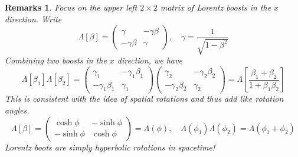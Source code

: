 \documentclass[a4paper]{article}
\newtheorem{remarks}{Remarks}[section]
\theoremstyle{new}
\begin{document}
\begin{remarks}
Focus on the upper left $2\times 2$ matrix of Lorentz boosts in the $x$ direction. Write
$$\Lambda[\beta] =
  \begin{pmatrix}
    \gamma & -\gamma\beta\\
    -\gamma\beta & \gamma
  \end{pmatrix}
  ,\quad
  \gamma = \frac{1}{\sqrt{1 - \beta^2}}$$
Combining two boosts in the $x$ direction, we have
$$\Lambda[\beta_1]\Lambda[\beta_2] =
  \begin{pmatrix}
    \gamma_1 & -\gamma_1\beta_1\\
    -\gamma_1\beta_1 & \gamma_1
  \end{pmatrix}
  \begin{pmatrix}
    \gamma_2 & -\gamma_2\beta_2\\
    -\gamma_2\beta_2 & \gamma_2
  \end{pmatrix}
  = \Lambda\left[\frac{\beta_1 + \beta_2}{1 + \beta_1\beta_2}\right]$$
This is consistent with the idea of spatial rotations and thus add like rotation angles.
$$\Lambda[\beta] =
  \begin{pmatrix}
    \cosh \phi & -\sinh \phi\\
    -\sinh \phi & \cosh \phi
  \end{pmatrix}
  = \Lambda(\phi),\quad\Lambda(\phi_1)\Lambda(\phi_2) = \Lambda(\phi_1 + \phi_2)$$
Lorentz boots are simply hyperbolic rotations in spacetime!
\end{remarks}
\end{document}
